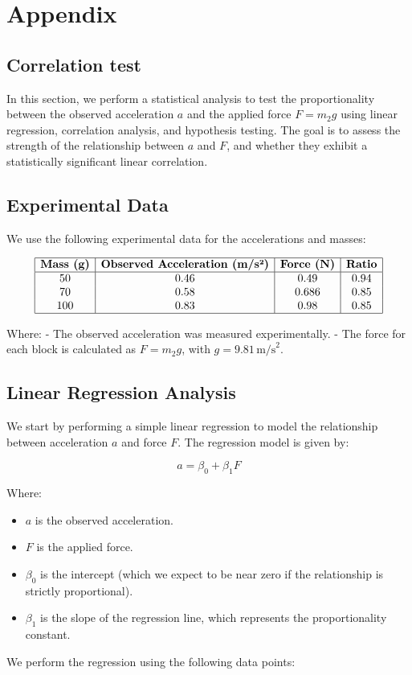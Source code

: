 \documentclass{article}
\begin{document}
\section*{Appendix}
\subsection{Correlation test}



In this section, we perform a statistical analysis to test the proportionality between the observed acceleration \(a\) and the applied force \(F = m_2 g\) using linear regression, correlation analysis, and hypothesis testing. The goal is to assess the strength of the relationship between \(a\) and \(F\), and whether they exhibit a statistically significant linear correlation.

\subsection*{Experimental Data}

We use the following experimental data for the accelerations and masses:

\[
\begin{array}{|c|c|c|c|}
\hline
\textbf{Mass (g)} & \textbf{Observed Acceleration (m/s²)} & \textbf{Force (N)} & \textbf{Ratio} \\
\hline
50  & 0.46  & 0.49  & 0.94 \\
70  & 0.58  & 0.686 & 0.85 \\
100 & 0.83  & 0.98  & 0.85 \\
\hline
\end{array}
\]

Where:
- The observed acceleration was measured experimentally.
- The force for each block is calculated as \( F = m_2 g \), with \( g = 9.81 \, \text{m/s}^2 \).

\subsection*{Linear Regression Analysis}

We start by performing a simple linear regression to model the relationship between acceleration \(a\) and force \(F\). The regression model is given by:

\[
a = \beta_0 + \beta_1 F
\]

Where:
\begin{itemize}
\item \(a\) is the observed acceleration.
\item \(F\) is the applied force.
\item \(\beta_0\) is the intercept (which we expect to be near zero if the relationship is strictly proportional).
\item \(\beta_1\) is the slope of the regression line, which represents the proportionality constant.
\end{itemize}
We perform the regression using the following data points:
\end{document}
